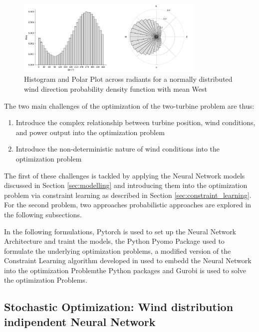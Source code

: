\documentclass[preprint,12pt]{elsarticle}
\begin{document}
\begin{figure}[h] 
	\centering
	\includegraphics[width=0.8\textwidth]{../figures/optimization/wind_dist.png} %
	\caption{Histogram and Polar Plot across radiants for a normally distributed wind direction probability density function with mean West}
	\label{fig:wind_dist}
\end{figure}

The two main challenges of the optimization of the two-turbine problem are thus: 

\begin{enumerate}
	\item Introduce the complex relationship between turbine position, wind conditions, and power output into the optimization problem
	\item Introduce the non-deterministic nature of wind conditions into the optimization problem
\end{enumerate}

The first of these challenges is tackled by applying the Neural Network models discussed in Section \ref{sec:modelling} and introducing them into the optimization problem via constraint learning as described in Section \ref{sec:constraint_learning}. For the second problem, two approaches probabilistic approaches are explored in the following subsections.

In the following formulations, Pytorch \cite{paszke2017automatic} is used to set up the Neural Network Architecture and traint the models, the Python Pyomo Package \cite{bynum2021pyomo} used to formulate the underlying optimization problems,  a modified version of the Constraint Learning algorithm developed in \cite{alcantara2024distcl} used to embedd the Neural Network into the optimization Problemthe Python packages and Gurobi \cite{gurobi} is used to solve the  optimization Problems.

\subsection{Stochastic Optimization: Wind distribution indipendent Neural Network} \label{sec:stoch_opti_1}
\end{document}
